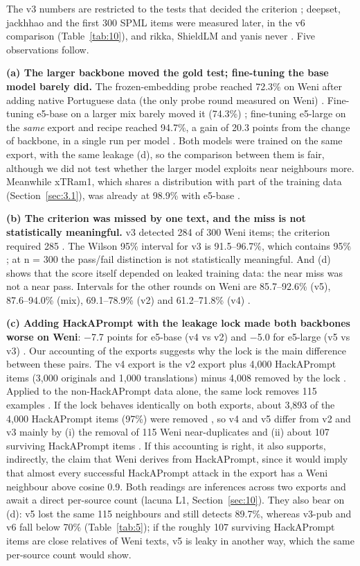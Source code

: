 \documentclass[11pt]{article}
\begin{document}
The v3 numbers are restricted to the tests that decided the criterion%
; deepset, jackhhao and the first 300 SPML items were measured later, in the v6 comparison (Table~\ref{tab:10}), and rikka, ShieldLM and yanis never%
. Five observations follow.

\textbf{(a) The larger backbone moved the gold test; fine-tuning the base model barely did.} The frozen-embedding probe reached 72.3\% on Weni after adding native Portuguese data (the only probe round measured on Weni)%
. Fine-tuning e5-base on a larger mix barely moved it (74.3\%)%
; fine-tuning e5-large on the \emph{same} export and recipe reached 94.7\%, a gain of 20.3 points from the change of backbone, in a single run per model%
. Both models were trained on the same export, with the same leakage (d), so the comparison between them is fair, although we did not test whether the larger model exploits near neighbours more. Meanwhile xTRam1, which shares a distribution with part of the training data (Section~\ref{sec:3.1}), was already at 98.9\% with e5-base%
.

\textbf{(b) The criterion was missed by one text, and the miss is not statistically meaningful.} v3 detected 284 of 300 Weni items; the criterion required 285%
. The Wilson 95\% interval \citep{wilson1927probable} for v3 is 91.5–96.7\%, which contains 95\%%
; at n = 300 the pass/fail distinction is not statistically meaningful. And (d) shows that the score itself depended on leaked training data: the near miss was not a near pass. Intervals for the other rounds on Weni are 85.7–92.6\% (v5), 87.6–94.0\% (mix), 69.1–78.9\% (v2) and 61.2–71.8\% (v4)%
.

\textbf{(c) Adding HackAPrompt with the leakage lock made both backbones worse on Weni}: \ensuremath{-}7.7 points for e5-base (v4 vs v2) and \ensuremath{-}5.0 for e5-large (v5 vs v3)%
. Our accounting of the exports suggests why the lock is the main difference between these pairs. The v4 export is the v2 export plus 4,000 HackAPrompt items (3,000 originals and 1,000 translations) %
minus 4,008 removed by the lock%
. Applied to the non-HackAPrompt data alone, the same lock removes 115 examples%
. If the lock behaves identically on both exports, about 3,893 of the 4,000 HackAPrompt items (97\%) were removed%
, so v4 and v5 differ from v2 and v3 mainly by (i) the removal of 115 Weni near-duplicates and (ii) about 107 surviving HackAPrompt items%
. If this accounting is right, it also supports, indirectly, the claim that Weni derives from HackAPrompt, since it would imply that almost every successful HackAPrompt attack in the export has a Weni neighbour above cosine 0.9. Both readings are inferences across two exports and await a direct per-source count (lacuna L1, Section~\ref{sec:10}). They also bear on (d): v5 lost the same 115 neighbours and still detects 89.7\%, whereas v3-pub and v6 fall below 70\% (Table~\ref{tab:5}); if the roughly 107 surviving HackAPrompt items are close relatives of Weni texts, v5 is leaky in another way, which the same per-source count would show.
\end{document}
